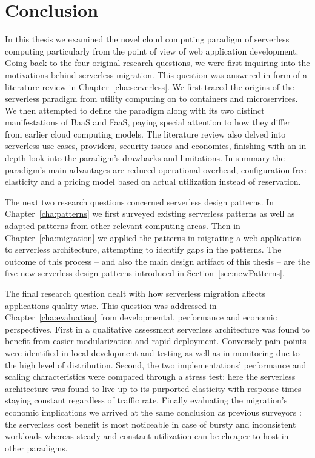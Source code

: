 \chapter{Conclusion}

In this thesis we examined the novel cloud computing paradigm of serverless computing particularly from the point of view of web application development. Going back to the four original research questions, we were first inquiring into the motivations behind serverless migration. This question was answered in form of a literature review in Chapter~\ref{cha:serverless}. We first traced the origins of the serverless paradigm from utility computing on to containers and microservices. We then attempted to define the paradigm along with its two distinct manifestations of BaaS and FaaS, paying special attention to how they differ from earlier cloud computing models. The literature review also delved into serverless use cases, providers, security issues and economics, finishing with an in-depth look into the paradigm's drawbacks and limitations. In summary the paradigm's main advantages are reduced operational overhead, configuration-free elasticity and a pricing model based on actual utilization instead of reservation.

The next two research questions concerned serverless design patterns. In Chapter~\ref{cha:patterns} we first surveyed existing serverless patterns as well as adapted patterns from other relevant computing areas. Then in Chapter~\ref{cha:migration} we applied the patterns in migrating a web application to serverless architecture, attempting to identify gaps in the patterns. The outcome of this process -- and also the main design artifact of this thesis -- are the five new serverless design patterns introduced in Section~\ref{sec:newPatterns}.

The final research question dealt with how serverless migration affects applications quality-wise. This question was addressed in Chapter~\ref{cha:evaluation} from developmental, performance and economic perspectives. First in a qualitative assessment serverless  architecture was found to benefit from easier modularization and rapid deployment. Conversely pain points were identified in local development and testing as well as in monitoring due to the high level of distribution. Second, the two implementations' performance and scaling characteristics were compared through a stress test: here the serverless architecture was found to live up to its purported elasticity with response times staying constant regardless of traffic rate. Finally evaluating the migration's economic implications we arrived at the same conclusion as previous surveyors \parencite[including][]{baldini17currentTrends}: the serverless cost benefit is most noticeable in case of bursty and inconsistent workloads whereas steady and constant utilization can be cheaper to host in other paradigms.

